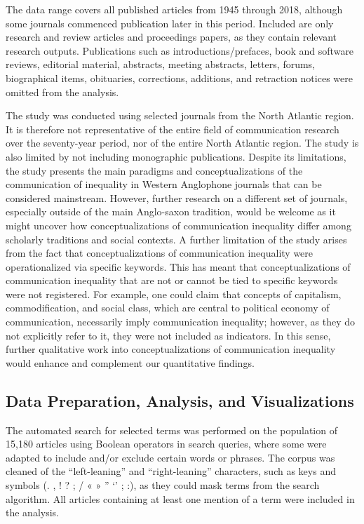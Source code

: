\documentclass{tufte-handout}
\begin{document}
The data range covers all published articles from 1945 through 2018,
although some journals commenced publication later in this period.
Included are only research and review articles and proceedings papers,
as they contain relevant research outputs. Publications such as
introductions/prefaces, book and software reviews, editorial material,
abstracts, meeting abstracts, letters, forums, biographical items,
obituaries, corrections, additions, and retraction notices were omitted
from the analysis.

The study was conducted using selected journals from the North Atlantic
region. It is therefore not representative of the entire field of
communication research over the seventy-year period, nor of the entire
North Atlantic region. The study is also limited by not including
monographic publications. Despite its limitations, the study presents
the main paradigms and conceptualizations of the communication of
inequality in Western Anglophone journals that can be considered
mainstream. However, further research on a different set of journals,
especially outside of the main Anglo-saxon tradition, would be welcome
as it might uncover how conceptualizations of communication inequality
differ among scholarly traditions and social contexts. A further
limitation of the study arises from the fact that conceptualizations of
communication inequality were operationalized via specific keywords.
This has meant that conceptualizations of communication inequality that
are not or cannot be tied to specific keywords were not registered. For
example, one could claim that concepts of capitalism, commodification,
and social class, which are central to political economy of
communication, necessarily imply communication inequality; however, as
they do not explicitly refer to it, they were not included as
indicators. In this sense, further qualitative work into
conceptualizations of communication inequality would enhance and
complement our quantitative findings.

\hypertarget{data-preparation-analysis-and-visualizations}{%
\subsection{Data Preparation, Analysis, and
Visualizations}\label{data-preparation-analysis-and-visualizations}}

The automated search for selected terms was performed on the population
of 15,180 articles using Boolean operators in search queries, where some
were adapted to include and/or exclude certain words or phrases. The
corpus was cleaned of the ``left-leaning'' and ``right-leaning''
characters, such as keys and symbols (. , ! ? ; / « » '' `' ; :), as
they could mask terms from the search algorithm. All articles containing
at least one mention of a term were included in the analysis.
\end{document}
